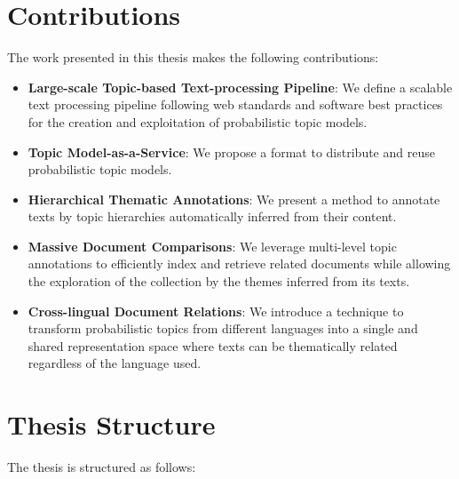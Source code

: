 


\section{Contributions}

The work presented in this thesis makes the following contributions:

\begin{itemize}
\item \textbf{Large-scale Topic-based Text-processing Pipeline}: We define a scalable text processing pipeline following web standards and software best practices for the creation and exploitation of probabilistic topic models.
\item \textbf{Topic Model-as-a-Service}: We propose a format to distribute and reuse probabilistic topic models.
\item \textbf{Hierarchical Thematic Annotations}: We present a method to annotate texts by topic hierarchies automatically inferred from their content.
\item \textbf{Massive Document Comparisons}: We leverage multi-level topic annotations to efficiently index and retrieve related documents while allowing the exploration of the collection by the themes inferred from its texts.
\item \textbf{Cross-lingual Document Relations}: We introduce a technique to transform probabilistic topics from different languages into a single and shared representation space where texts can be thematically related regardless of the language used.
\end{itemize}

\section{Thesis Structure}

The thesis is structured as follows:

